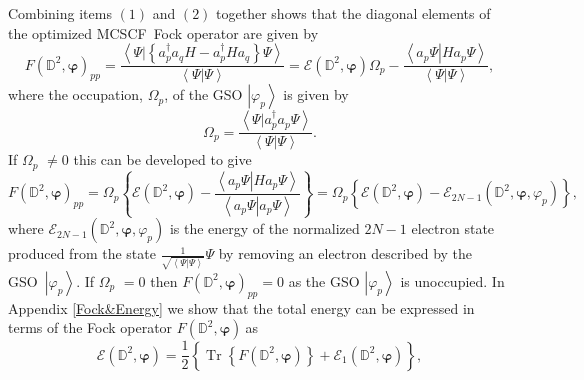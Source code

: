 \documentclass[titlepage]{article}%
\begin{document}
Combining items $\left(  1\right)  $ and $\left(  2\right)  $ together shows
that the diagonal elements of the optimized MCSCF\ Fock operator are given by
\begin{equation}
F\left(  \mathbb{D}^{2},\bm{\varphi}\right)  _{pp}=\frac{\left\langle \left.
\Psi\right\vert \left\{  a_{p}^{\dagger}a_{q}H-a_{p}^{\dagger}Ha_{q}\right\}
\Psi\right\rangle }{\left\langle \left.  \Psi\right\vert \Psi\right\rangle
}=\mathcal{E}\left(  \mathbb{D}^{2},\bm{\varphi}\right)  \Omega_{p}%
-\frac{\left\langle \left.  a_{p}\Psi\right\vert Ha_{p}\Psi\right\rangle
}{\left\langle \left.  \Psi\right\vert \Psi\right\rangle },
\end{equation}
where the occupation, $\Omega_{p}$, of the GSO $\left\vert \varphi
_{p}\right\rangle $ is given by
\begin{equation}
\Omega_{p}=\frac{\left\langle \left.  \Psi\right\vert a_{p}^{\dagger}a_{p}%
\Psi\right\rangle }{\left\langle \left.  \Psi\right\vert \Psi\right\rangle }.
\end{equation}
If $\Omega_{p}$ $\neq0$ this can be developed to give
\begin{equation}
F\left(  \mathbb{D}^{2},\bm{\varphi}\right)  _{pp}=\Omega_{p}\left\{
\mathcal{E}\left(  \mathbb{D}^{2},\bm{\varphi}\right)  -\frac{\left\langle
\left.  a_{p}\Psi\right\vert Ha_{p}\Psi\right\rangle }{\left\langle \left.
a_{p}\Psi\right\vert a_{p}\Psi\right\rangle }\right\}  =\Omega_{p}\left\{
\mathcal{E}\left(  \mathbb{D}^{2},\bm{\varphi}\right)  -\mathcal{E}%
_{2N-1}\left(  \mathbb{D}^{2},\bm{\varphi,}\varphi_{p}\right)  \right\}  ,
\end{equation}
where $\mathcal{E}_{2N-1}\left(  \mathbb{D}^{2},\bm{\varphi,}\varphi
_{p}\right)  $ is the energy of the normalized $2N-1$ electron state produced
from the state $\frac{1}{\sqrt{\left\langle \left.  \Psi\right\vert
\Psi\right\rangle }}\Psi$ by removing an electron described by the
GSO\ $\left\vert \varphi_{p}\right\rangle $. If $\Omega_{p}$ $=0$ then
$F\left(  \mathbb{D}^{2},\bm{\varphi}\right)  _{pp}=0$ as the GSO $\left\vert
\varphi_{p}\right\rangle $ is unoccupied. In Appendix \ref{Fock&Energy} we
show that the total energy can be expressed in terms of the Fock operator
$F\left(  \mathbb{D}^{2},\bm{\varphi}\right)  \ $as
\begin{equation}
\mathcal{E}\left(  \mathbb{D}^{2},\bm{\varphi}\right)  =\frac{1}{2}\left\{
\overset{}{\operatorname{Tr}\left\{  F\left(  \mathbb{D}^{2}%
,\bm{\varphi}\right)  \right\}  +\mathcal{E}_{1}\left(  \mathbb{D}%
^{2},\bm{\varphi}\right)  }\right\}  ,
\end{equation}
\end{document}
